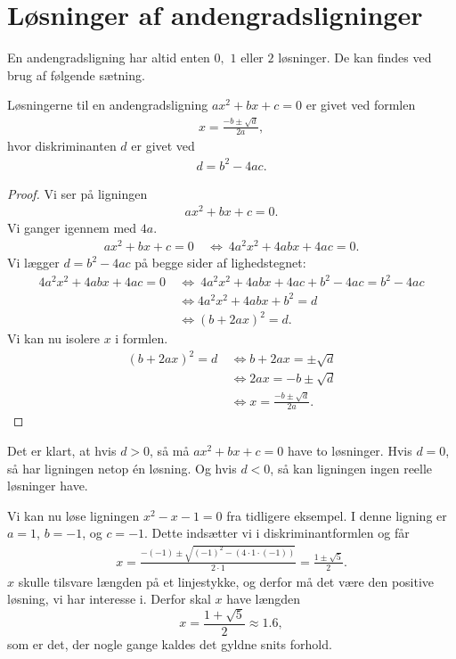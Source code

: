 \documentclass[12pt]{article}
\begin{document}
\section*{Løsninger af andengradsligninger}
En andengradsligning har altid enten $0,$ $1$ eller $2$ løsninger. De kan findes ved brug af følgende sætning.
\begin{setn}
Løsningerne til en andengradsligning $ax^2+bx+c=0$ er givet ved formlen
\begin{align*}
x = \frac{-b\pm \sqrt{d}}{2a},
\end{align*}
hvor diskriminanten $d$ er givet ved
\begin{align*}
d=b^2-4ac.
\end{align*}
\end{setn}
\begin{proof}
Vi ser på ligningen
\begin{align*}
ax^2+bx+c = 0.
\end{align*}
Vi ganger igennem med $4a$.
\begin{align*}
ax^2+bx+c = 0\ &\Leftrightarrow \ 4a^2x^2+4abx+4ac=0.
\end{align*}
Vi lægger $d = b^2-4ac$ på begge sider af lighedstegnet:
\begin{align*}
4a^2x^2+4abx+4ac=0 \ &\Leftrightarrow \ 4a^2x^2+4abx+4ac + b^2-4ac=b^2-4ac\\
&\Leftrightarrow 4a^2x^2+4abx+b^2 = d\\
&\Leftrightarrow (b+2ax)^2 = d.
\end{align*}
Vi kan nu isolere $x$ i formlen.
\begin{align*}
(b+2ax)^2 = d \ &\Leftrightarrow b+2ax = \pm \sqrt{d}\\
&\Leftrightarrow 2ax = -b \pm \sqrt{d}\\
&\Leftrightarrow x = \frac{-b\pm \sqrt{d}}{2a}.
\end{align*}
\end{proof}
Det er klart, at hvis $d>0$, så må $ax^2+bx+c=0$ have to løsninger. Hvis $d=0$, så har ligningen netop én løsning. Og hvis $d<0$, så kan ligningen ingen reelle løsninger have. 
\begin{exa}
Vi kan nu løse ligningen $x^2-x-1=0$ fra tidligere eksempel. I denne ligning er $a=1$, $b=-1$, og $c = -1$. Dette indsætter vi i diskriminantformlen og får
\begin{align*}
x = \frac{-(-1)\pm \sqrt{(-1)^2-(4\cdot 1 \cdot (-1))}}{2\cdot 1} = \frac{1 \pm\sqrt{5}}{2}.
\end{align*}
$x$ skulle tilsvare længden på et linjestykke, og derfor må det være den positive løsning, vi har interesse i. Derfor skal $x$ have længden $$x = \frac{1 +\sqrt{5}}{2}\approx 1.6, $$som er det, der nogle gange kaldes det gyldne snits forhold. 
\end{exa}
\end{document}
